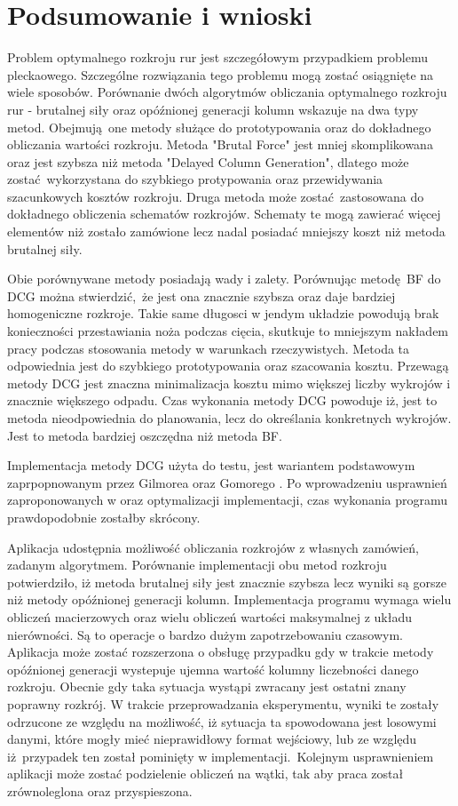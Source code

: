 \section{Podsumowanie i wnioski}
Problem optymalnego rozkroju rur jest szczegółowym przypadkiem problemu pleckaowego. Szczególne rozwiązania tego problemu mogą zostać osiągnięte na wiele sposobów. Porównanie dwóch algorytmów obliczania optymalnego rozkroju rur - brutalnej siły oraz opóźnionej generacji kolumn wskazuje na dwa typy metod. Obejmują one metody służące do prototypowania oraz do dokładnego obliczania wartości rozkroju. Metoda "Brutal Force" jest mniej skomplikowana oraz jest szybsza niż metoda "Delayed Column Generation", dlatego może zostać wykorzystana do szybkiego protypowania oraz przewidywania szacunkowych kosztów rozkroju. Druga metoda może zostać zastosowana do dokładnego obliczenia schematów rozkrojów. Schematy te mogą zawierać więcej elementów niż zostało zamówione lecz nadal posiadać mniejszy koszt niż metoda brutalnej siły.

Obie porównywane metody posiadają wady i zalety. Porównując metodę BF do DCG można stwierdzić, że jest ona znacznie szybsza oraz daje bardziej homogeniczne rozkroje. Takie same długosci w jendym układzie powodują brak konieczności przestawiania noża podczas cięcia, skutkuje to mniejszym nakładem pracy podczas stosowania metody w warunkach rzeczywistych. Metoda ta odpowiednia jest do szybkiego prototypowania oraz szacowania kosztu. Przewagą metody DCG jest znaczna minimalizacja kosztu mimo większej liczby wykrojów i znacznie większego odpadu. Czas wykonania metody DCG powoduje iż, jest to metoda nieodpowiednia do planowania, lecz do określania konkretnych wykrojów. Jest to metoda bardziej oszczędna niż metoda BF.

Implementacja metody DCG użyta do testu, jest wariantem podstawowym zaprpopnowanym przez Gilmorea oraz Gomorego \cite{GilmoreGomoryV1Article}. Po wprowadzeniu usprawnień zaproponowanych w \cite{GilmoreGomoryV2Article} oraz optymalizacji implementacji, czas wykonania programu prawdopodobnie zostałby skrócony.

Aplikacja udostępnia możliwość obliczania rozkrojów z własnych zamówień, zadanym algorytmem. Porównanie implementacji obu metod rozkroju potwierdziło, iż metoda brutalnej siły jest znacznie szybsza lecz wyniki są gorsze niż metody opóźnionej generacji kolumn. Implementacja programu wymaga wielu obliczeń macierzowych oraz wielu obliczeń wartości maksymalnej z układu nierówności. Są to operacje o bardzo dużym zapotrzebowaniu czasowym. Aplikacja może zostać rozszerzona o obsługę przypadku gdy w trakcie metody opóźnionej generacji wystepuje ujemna wartość kolumny liczebności danego rozkroju. Obecnie gdy taka sytuacja wystąpi zwracany jest ostatni znany poprawny rozkrój. W trakcie przeprowadzania eksperymentu, wyniki te zostały odrzucone ze względu na możliwość, iż sytuacja ta spowodowana jest losowymi danymi, które mogły mieć nieprawidłowy format wejściowy, lub ze względu iż przypadek ten został pominięty w implementacji. Kolejnym usprawnieniem aplikacji może zostać podzielenie obliczeń na wątki, tak aby praca został zrównoleglona oraz przyspieszona.

